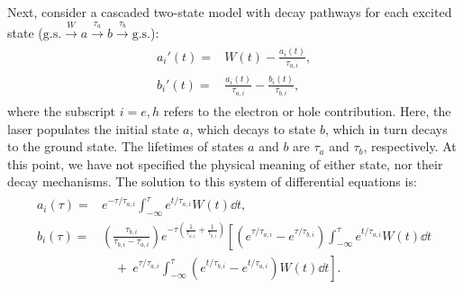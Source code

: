 Next, consider a cascaded two-state model with decay pathways for each excited state ($\textrm{g.s.} \xrightarrow{W} a \xrightarrow{\tau_a} b \xrightarrow{\tau_b} \textrm{g.s.}$):
\begin{align}
\label{eqn:2_state_pop_model}
\begin{split}
a_{i}'(t) ={}& W(t) - \frac{a_{i}(t)}{\tau_{a,i}}, \\
b_{i}'(t) ={}& \frac{a_{i}(t)}{\tau_{a,i}} - \frac{b_{i}(t)}{\tau_{b,i}},
\end{split}
\end{align}
where the subscript $i=e,h$ refers to the electron or hole contribution. Here, the laser populates the initial state $a$, which decays to state $b$, which in turn decays to the ground state. The lifetimes of states $a$ and $b$ are $\tau_a$ and $\tau_b$, respectively. At this point, we have not specified the physical meaning of either state, nor their decay mechanisms. The solution to this system of differential equations is:
\begin{align}
\label{eqn:2_state_pop_sol}
\begin{split}
a_i(\tau) ={}& e^{-\tau/\tau_{a,i}} \int_{-\infty}^{\tau} e^{t/\tau_{a,i}} W(t) \dd{t}, \\
b_i(\tau) ={}& \left( \frac{\tau_{b,i}}{\tau_{b,i} - \tau_{a,i}} \right) e^{-\tau \left(\frac{1}{\tau_{a,i}}+\frac{1}{\tau_{b,i}} \right)} \left[ \left(e^{\tau/\tau_{a,i}}-e^{\tau/\tau_{b,i}}\right) \int_{-\infty}^{\tau} e^{t/\tau_{a,i}} W(t) \dd{t} \right. \\
& \left. \quad + \ e^{\tau/\tau_{a,i}} \int_{-\infty}^{\tau} \left(e^{t/\tau_{b,i}} - e^{t/\tau_{a,i}} \right) W(t) \dd{t}  \right].
\end{split}
\end{align}

